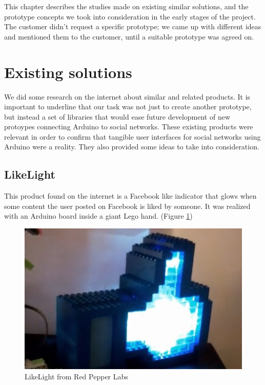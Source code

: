 
This chapter describes the studies made on existing similar solutions,
and the prototype concepts we took into consideration in the early stages of the project.
The customer didn't request a specific prototype; we came up with different ideas and mentioned
them to the customer, until a suitable prototype was agreed on.

\section{Existing solutions}
We did some research on the internet about similar and related products. It is important to underline that our task was
not just to create another prototype, but instead a set of libraries that would ease future development of new protoypes
connecting Arduino to social networks. These existing products were relevant in order to confirm that tangible user interfaces
for social networks using Arduino were a reality. They also provided some ideas to take into consideration.

\newpage

\subsection{LikeLight}
This product found on the internet is a Facebook like indicator that glows when some content the
user posted on Facebook is liked by someone. It was realized with an Arduino board inside a giant Lego hand.
(Figure \ref{fig:prestudies-likehand})

\begin{figure}[h!]
\centering \includegraphics[scale=0.85]{img/prestudies-likehand}
\caption{LikeLight from Red Pepper Labs\cite{link:likelight}}
\label{fig:prestudies-likehand}
\end{figure}

